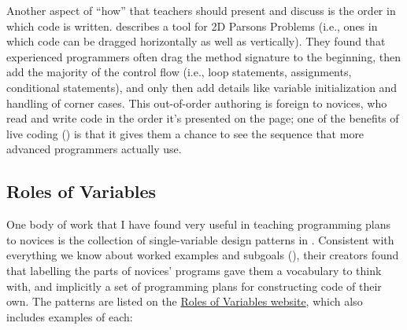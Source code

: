 Another aspect of ``how'' that teachers should present and discuss is
the order in which code is written.  \cite{Ihan2011} describes a tool
for 2D Parsons Problems (i.e., ones in which code can be dragged
horizontally as well as vertically).  They found that experienced
programmers often drag the method signature to the beginning, then add
the majority of the control flow (i.e., loop statements, assignments,
conditional statements), and only then add details like variable
initialization and handling of corner cases.  This out-of-order
authoring is foreign to novices, who read and write code in the order
it's presented on the page; one of the benefits of live coding
() is that it gives them a chance to see
the sequence that more advanced programmers actually use.

\subsection*{Roles of Variables}

One body of work that I have found very useful in teaching programming
plans to novices is the collection of single-variable design patterns
in \cite{Kuit2004,Byck2005,Saja2006}.  Consistent with everything we
know about worked examples and subgoals (), their
creators found that labelling the parts of novices' programs gave them
a vocabulary to think with, and implicitly a set of programming plans
for constructing code of their own.  The patterns are listed on the
\href{http://saja.kapsi.fi/var\_roles/}{Roles of Variables website},
which also includes examples of each:

